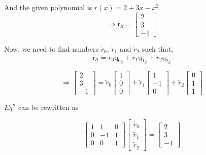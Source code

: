 \documentclass[a4paper]{article}
\begin{document}
\begin{qalist}
		And the given polynomial is $r(x) = 2 + 3x - {x}^{2}$.
		\begin{equation}
			\Rightarrow {\text{r}}_{\mathcal{S}} = \begin{bmatrix} 2 \\ 3 \\ -1 \end{bmatrix}
		\end{equation}
		
		Now, we need to find numbers ${\tilde{r}}_{0}$, ${\tilde{r}}_{1}$ and ${\tilde{r}}_{2}$ such that,
		\begin{equation}{\text{r}}_{\mathcal{S}} = {\tilde{r}}_{0}{\text{q}}_{{0}_{\mathcal{S}}} + {\tilde{r}}_{1}{\text{q}}_{{1}_{\mathcal{S}}} + {\tilde{r}}_{2}{\text{q}}_{{2}_{\mathcal{S}}}\end{equation}
		
		\begin{equation}
			\Rightarrow \begin{bmatrix} 2 \\ 3 \\ -1 \end{bmatrix} = 
			{\tilde{r}}_{0}\begin{bmatrix}1 \\ 0 \\ 0\end{bmatrix} + 
			{\tilde{r}}_{1}\begin{bmatrix}1 \\ -1 \\ 0\end{bmatrix} + 
			{\tilde{r}}_{2}\begin{bmatrix}0 \\ 1 \\ 1\end{bmatrix}
		\end{equation}
		
		${Eq}^{n}$ can be rewritten as
		
		\begin{equation}
			\begin{bmatrix}1 & 1 & 0 \\ 0 & -1 & 1 \\ 0 & 0 & 1\end{bmatrix} \begin{bmatrix}{\tilde{r}}_{0} \\ {\tilde{r}}_{1} \\ {\tilde{r}}_{2}\end{bmatrix} = \begin{bmatrix} 2 \\ 3 \\ -1 \end{bmatrix}
		\end{equation}
		

\end{qalist}
\end{document}
